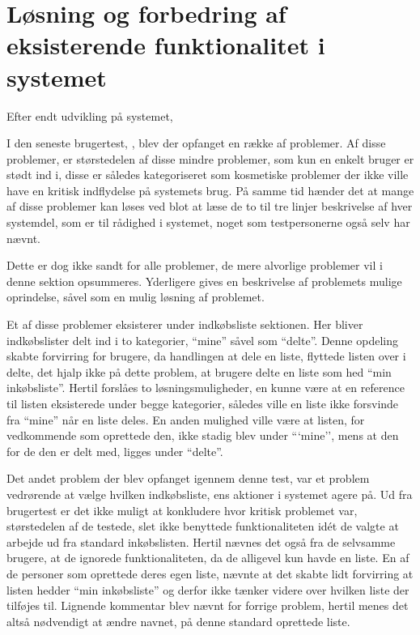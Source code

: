 \section{Løsning og forbedring af eksisterende funktionalitet i systemet}
Efter endt udvikling på systemet,

I den seneste brugertest, , blev der opfanget en række af problemer.
Af disse problemer, er størstedelen af disse mindre problemer, som kun en enkelt bruger er stødt ind i, disse er således kategoriseret som kosmetiske problemer der ikke ville have en kritisk indflydelse på systemets brug.
På samme tid hænder det at mange af disse problemer kan løses ved blot at læse de to til tre linjer beskrivelse af hver systemdel, som er til rådighed i systemet, noget som testpersonerne også selv har nævnt.

Dette er dog ikke sandt for alle problemer, de mere alvorlige problemer vil i denne sektion opsummeres.
Yderligere gives en beskrivelse af problemets mulige oprindelse, såvel som en mulig løsning af problemet.

Et af disse problemer eksisterer under indkøbsliste sektionen.
Her bliver indkøbslister delt ind i to kategorier, ``mine'' såvel som ``delte''.
Denne opdeling skabte forvirring for brugere, da handlingen at dele en liste, flyttede listen over i delte, det hjalp ikke på dette problem, at brugere delte en liste som hed ``min inkøbsliste''.
Hertil forslåes to løsningsmuligheder, en kunne være at en reference til listen eksisterede under begge kategorier, således ville en liste ikke forsvinde fra ``mine'' når en liste deles.
En anden mulighed ville være at listen, for vedkommende som oprettede den, ikke stadig blev under ```mine'', mens at den for de den er delt med, ligges under ``delte''.

Det andet problem der blev opfanget igennem denne test, var et problem vedrørende at vælge hvilken indkøbsliste, ens aktioner i systemet agere på.
Ud fra brugertest er det ikke muligt at konkludere hvor kritisk problemet var, størstedelen af de testede, slet ikke benyttede funktionaliteten idét de valgte at arbejde ud fra standard inkøbslisten.
Hertil nævnes det også fra de selvsamme brugere, at de ignorede funktionaliteten, da de alligevel kun havde en liste.
En af de personer som oprettede deres egen liste, nævnte at det skabte lidt forvirring at listen hedder ``min inkøbsliste'' og derfor ikke tænker videre over hvilken liste der tilføjes til.
Lignende kommentar blev nævnt for forrige problem, hertil menes det altså nødvendigt at ændre navnet, på denne standard oprettede liste.


